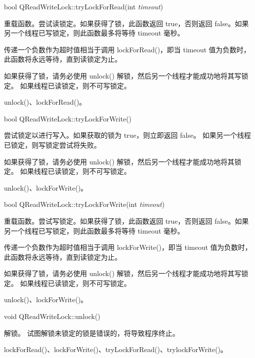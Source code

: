 bool QReadWriteLock::tryLockForRead(int \emph{timeout})

重载函数。尝试读锁定。如果获得了锁，此函数返回 true，否则返回 false。如果另一个线程已写锁定，则此函数最多将等待 timeout 毫秒。

\begin{notice}
传递一个负数作为超时值相当于调用 lockForRead()，即当 timeout 值为负数时，此函数将永远等待，直到读锁定为止。
\end{notice} 

如果获得了锁，请务必使用 unlock() 解锁，然后另一个线程才能成功地将其写锁定。
如果线程已读锁定，则不可写锁定。

\begin{seeAlso}
unlock()、lockForRead()。
\end{seeAlso} 

bool QReadWriteLock::tryLockForWrite()

尝试锁定以进行写入。如果获取的锁为 true，则立即返回 false。
如果另一个线程已锁定，则写锁定尝试将失败。

如果获得了锁，请务必使用 unlock() 解锁，然后另一个线程才能成功地将其锁定。
如果线程已读锁定，则不可写锁定。

\begin{seeAlso}
unlock()、lockForWrite()。
\end{seeAlso}

bool QReadWriteLock::tryLockForWrite(int \emph{timeout})

重载函数。尝试写锁定。如果获得了锁，此函数返回 true，否则返回 false。如果另一个线程已写锁定，则此函数最多将等待 timeout 毫秒。

\begin{notice}
传递一个负数作为超时值相当于调用 lockForWrite()，即当 timeout 值为负数时，此函数将永远等待，直到读锁定为止。
\end{notice}

如果获得了锁，请务必使用 unlock() 解锁，然后另一个线程才能成功地将其写锁定。
如果线程已读锁定，则不可写锁定。

\begin{seeAlso}
unlock()、lockForWrite()。
\end{seeAlso}

void QReadWriteLock::unlock()

解锁。 试图解锁未锁定的锁是错误的，将导致程序终止。
 
\begin{seeAlso}
lockForRead()、lockForWrite()、tryLockForRead()、trylockForWrite()。
\end{seeAlso}